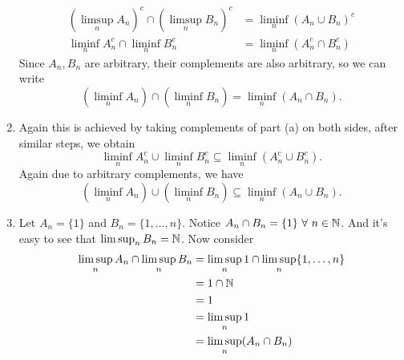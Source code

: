 \documentclass[12pt]{article}
\begin{document}
\begin{problem}[2]
\begin{enumerate}[label=\alph*)]
\begin{align*}
		\left( \limsup_{  n} A_n \right)^{c} \cap \left( \limsup_{  n} B_n \right)^{c} &= \liminf_{  n} (A_n \cup B_n)^{c} \\
		\liminf_{  n} A_n^{c} \cap \liminf_{  n} B_n^{c} &= \liminf_{  n} \left( A_n^{c} \cap B_n^{c} \right) 
	\end{align*}
	Since $ A_n,B_n$ are arbitrary, their complements are also arbitrary, so we can write
	\[
		(\liminf_{  n} A_n) \cap (\liminf_{  n} B_n) = \liminf_{  n} (A_n \cap B_n)
	.\]
\item Again this is achieved by taking complements of part (a) on both sides, after similar steps, we obtain
	\[
		\liminf_{  n} A_n^{c} \cup \liminf_{  n} B_n^{c} \subseteq \liminf_{  n} \left( A_n^{c} \cup B_n^{c} \right)
	.\] 
	Again due to arbitrary complements, we have
	\[
		(\liminf_{  n} A_n) \cup (\liminf_{  n} B_n) \subseteq \liminf_{  n} (A_n \cup B_n)
	.\] 
\item Let $ A_n= \{1\} $ and $ B_n = \{1,\ldots,n\} $. Notice $ A_n \cap B_n = \{1\} \ \forall \ n \in \mathbb{N}$. And it's easy to see that $ \limsup_{  n} B_n = \mathbb{N}$. Now consider
	\begin{align*}
		\limsup_{  n} A_n \cap \limsup_{  n} B_n &=\limsup_{  n} 1 \cap \limsup_{  n} \{1,\ldots,n\} \\
		&= 1 \cap \mathbb{N} \\ 
		&= 1 \\
		&= \limsup_{  n} 1 \\
		&= \limsup_{  n} (A_n \cap B_n) \\
	\end{align*}
\end{enumerate}
\end{problem}
\end{document}
